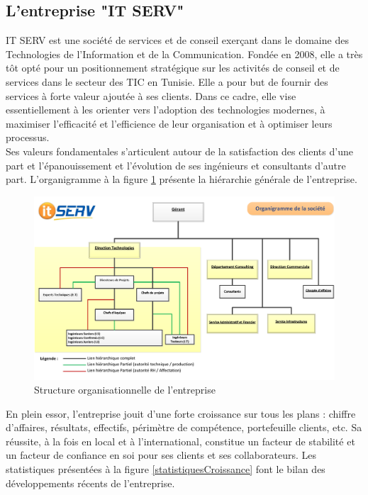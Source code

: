 \begin{spacing}{1.5}
\subsection{L'entreprise "IT SERV"}
IT SERV est une société de services et de conseil exerçant dans le domaine des Technologies de l'Information et de la Communication.
Fondée en 2008, elle a très tôt opté pour un positionnement stratégique sur les activités de conseil et de services dans le secteur des TIC en Tunisie. Elle a pour but de fournir des services à forte valeur ajoutée à ses clients. Dans ce cadre, elle vise essentiellement à les orienter vers l'adoption des technologies modernes, à maximiser l'efficacité et l'efficience de leur organisation et à optimiser leurs processus.\\
Ses valeurs fondamentales s'articulent autour de la satisfaction des clients d'une part et l'épanouissement et l'évolution de ses ingénieurs et consultants d'autre part. L'organigramme à la figure \ref{fig:organigramme} présente la hiérarchie générale de l'entreprise.\\

\begin{figure}[h]
\centering
\includegraphics[width=1\linewidth]{organigramme.png}
\caption{Structure organisationnelle de l'entreprise}
\label{fig:organigramme}
\end{figure}

En plein essor, l'entreprise jouit d'une forte croissance sur tous les plans : chiffre d'affaires, résultats, effectifs, périmètre de compétence, portefeuille clients, etc. Sa réussite, à la fois en local et à l'international, constitue un facteur de stabilité et un facteur de confiance en soi pour ses clients et ses collaborateurs. Les statistiques présentées à la figure \ref{statistiquesCroissance} font le bilan des développements récents de l'entreprise.\\


\end{spacing}
